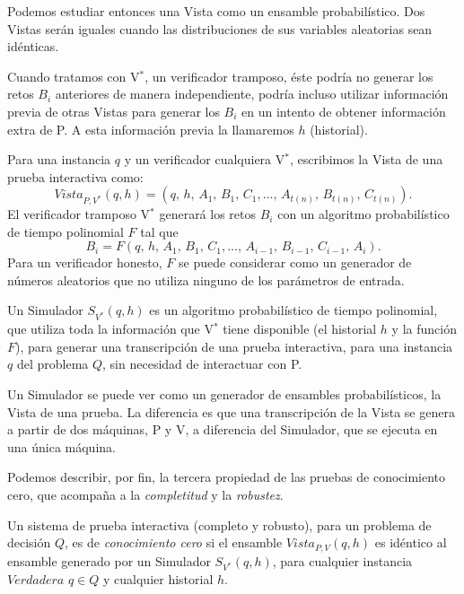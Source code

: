 Podemos estudiar entonces una Vista como un ensamble probabilístico. Dos Vistas serán iguales cuando las distribuciones de sus variables aleatorias sean idénticas.


\hfil

Cuando tratamos con V$^*$, un verificador tramposo, éste podría no generar los retos $B_i$ anteriores de manera independiente, podría incluso utilizar información previa de otras Vistas para generar los $B_i$ en un intento de obtener información extra de P. A esta información previa la llamaremos $h$ (historial).

Para una instancia $q$ y un verificador cualquiera V$^*$, escribimos la Vista de una prueba interactiva como:
\[ Vista_{P,V^*}(q,h) = (q,\,h,\,A_1,\,B_1,\,C_1, \dots ,\,A_{t(n)},\,B_{t(n)},\,C_{t(n)}). \]
El verificador tramposo V$^*$ generará los retos $B_i$ con un algoritmo probabilístico de tiempo polinomial $F$ tal que
\[ B_i = F(q,\,h,\,A_1,\,B_1,\,C_1, \dots ,\,A_{i-1},\,B_{i-1},\,C_{i-1},\,A_i). \]
Para un verificador honesto, $F$ se puede considerar como un generador de números aleatorios que no utiliza ninguno de los parámetros de entrada.



\begin{definition}
	Un Simulador $S_{V^*}(q,h)$ es un algoritmo probabilístico de tiempo polinomial, que utiliza toda la información que V$^*$ tiene disponible (el historial $h$ y la función $F$), para generar una transcripción de una prueba interactiva, para una instancia $q$ del problema $Q$, sin necesidad de interactuar con P.
\end{definition}

Un Simulador se puede ver como un generador de ensambles probabilísticos, la Vista de una prueba. La diferencia es que una transcripción de la Vista se genera a partir de dos máquinas, P y V, a diferencia del Simulador, que se ejecuta en una única máquina.


\hfil

Podemos describir, por fin, la tercera propiedad de las pruebas de conocimiento cero, que acompaña a la \textit{completitud} y la \textit{robustez}.



\begin{definition}	
	Un sistema de prueba interactiva (completo y robusto), para un problema de decisión $Q$, es de \textit{conocimiento cero} si el ensamble $Vista_{P,V}(q,h)$ es idéntico al ensamble generado por un Simulador $S_{V^*}(q,h)$, para cualquier instancia $Verdadera$ $q\in Q$ y cualquier historial $h$.
\end{definition}

